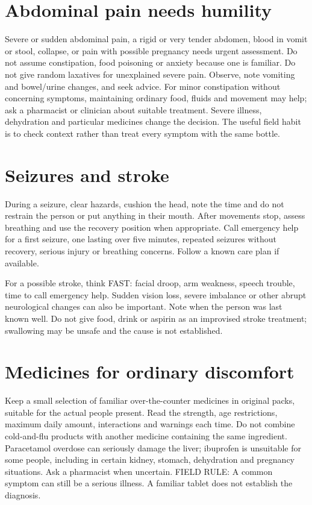 \documentclass[10pt,openright]{book}
\begin{document}
\section*{Abdominal pain needs humility}
Severe or sudden abdominal pain, a rigid or very tender abdomen, blood in vomit or stool, collapse, or pain with possible pregnancy needs urgent assessment. Do not assume constipation, food poisoning or anxiety because one is familiar. Do not give random laxatives for unexplained severe pain. Observe, note vomiting and bowel/urine changes, and seek advice. For minor constipation without concerning symptoms, maintaining ordinary food, fluids and movement may help; ask a pharmacist or clinician about suitable treatment. Severe illness, dehydration and particular medicines change the decision. The useful field habit is to check context rather than treat every symptom with the same bottle.

\section*{Seizures and stroke}
During a seizure, clear hazards, cushion the head, note the time and do not restrain the person or put anything in their mouth. After movements stop, assess breathing and use the recovery position when appropriate. Call emergency help for a first seizure, one lasting over five minutes, repeated seizures without recovery, serious injury or breathing concerns. Follow a known care plan if available.

For a possible stroke, think FAST: facial droop, arm weakness, speech trouble, time to call emergency help. Sudden vision loss, severe imbalance or other abrupt neurological changes can also be important. Note when the person was last known well. Do not give food, drink or aspirin as an improvised stroke treatment; swallowing may be unsafe and the cause is not established.

\section*{Medicines for ordinary discomfort}
Keep a small selection of familiar over-the-counter medicines in original packs, suitable for the actual people present. Read the strength, age restrictions, maximum daily amount, interactions and warnings each time. Do not combine cold-and-flu products with another medicine containing the same ingredient. Paracetamol overdose can seriously damage the liver; ibuprofen is unsuitable for some people, including in certain kidney, stomach, dehydration and pregnancy situations. Ask a pharmacist when uncertain. FIELD RULE: A common symptom can still be a serious illness. A familiar tablet does not establish the diagnosis.
\end{document}
